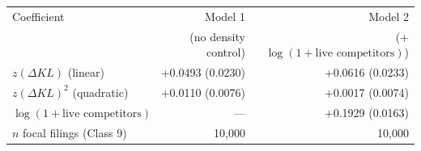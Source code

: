 \begin{tabular}{lrr}
\toprule
Coefficient & Model 1 & Model 2 \\
 & (no density control) & (+ $\log(1+\text{live competitors})$) \\
\midrule
$z(\Delta KL)$ (linear) & +0.0493 (0.0230) & +0.0616 (0.0233) \\
$z(\Delta KL)^2$ (quadratic) & +0.0110 (0.0076) & +0.0017 (0.0074) \\
$\log(1+\text{live competitors})$ & --- & +0.1929 (0.0163) \\
\midrule
$n$ focal filings (Class 9) & 10,000 & 10,000 \\
\bottomrule
\end{tabular}
